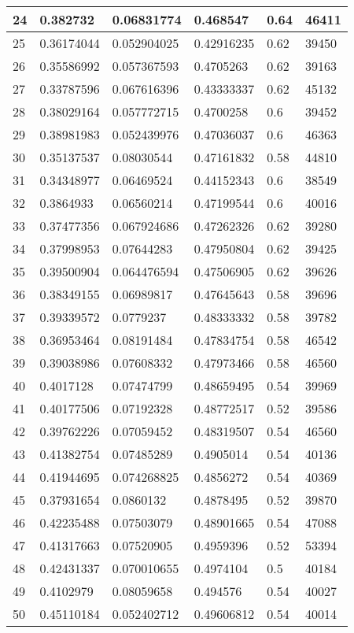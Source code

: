 \begin{longtable}{|l|l|l|l|l|l|}
24 & 0.382732 & 0.06831774 & 0.468547 & 0.64 & 46411 \\ \hline 
25 & 0.36174044 & 0.052904025 & 0.42916235 & 0.62 & 39450 \\ \hline 
26 & 0.35586992 & 0.057367593 & 0.4705263 & 0.62 & 39163 \\ \hline 
27 & 0.33787596 & 0.067616396 & 0.43333337 & 0.62 & 45132 \\ \hline 
28 & 0.38029164 & 0.057772715 & 0.4700258 & 0.6 & 39452 \\ \hline 
29 & 0.38981983 & 0.052439976 & 0.47036037 & 0.6 & 46363 \\ \hline 
30 & 0.35137537 & 0.08030544 & 0.47161832 & 0.58 & 44810 \\ \hline 
31 & 0.34348977 & 0.06469524 & 0.44152343 & 0.6 & 38549 \\ \hline 
32 & 0.3864933 & 0.06560214 & 0.47199544 & 0.6 & 40016 \\ \hline 
33 & 0.37477356 & 0.067924686 & 0.47262326 & 0.62 & 39280 \\ \hline 
34 & 0.37998953 & 0.07644283 & 0.47950804 & 0.62 & 39425 \\ \hline 
35 & 0.39500904 & 0.064476594 & 0.47506905 & 0.62 & 39626 \\ \hline 
36 & 0.38349155 & 0.06989817 & 0.47645643 & 0.58 & 39696 \\ \hline 
37 & 0.39339572 & 0.0779237 & 0.48333332 & 0.58 & 39782 \\ \hline 
38 & 0.36953464 & 0.08191484 & 0.47834754 & 0.58 & 46542 \\ \hline 
39 & 0.39038986 & 0.07608332 & 0.47973466 & 0.58 & 46560 \\ \hline 
40 & 0.4017128 & 0.07474799 & 0.48659495 & 0.54 & 39969 \\ \hline 
41 & 0.40177506 & 0.07192328 & 0.48772517 & 0.52 & 39586 \\ \hline 
42 & 0.39762226 & 0.07059452 & 0.48319507 & 0.54 & 46560 \\ \hline 
43 & 0.41382754 & 0.07485289 & 0.4905014 & 0.54 & 40136 \\ \hline 
44 & 0.41944695 & 0.074268825 & 0.4856272 & 0.54 & 40369 \\ \hline 
45 & 0.37931654 & 0.0860132 & 0.4878495 & 0.52 & 39870 \\ \hline 
46 & 0.42235488 & 0.07503079 & 0.48901665 & 0.54 & 47088 \\ \hline 
47 & 0.41317663 & 0.07520905 & 0.4959396 & 0.52 & 53394 \\ \hline 
48 & 0.42431337 & 0.070010655 & 0.4974104 & 0.5 & 40184 \\ \hline 
49 & 0.4102979 & 0.08059658 & 0.494576 & 0.54 & 40027 \\ \hline 
50 & 0.45110184 & 0.052402712 & 0.49606812 & 0.54 & 40014 \\ \hline 
\end{longtable}